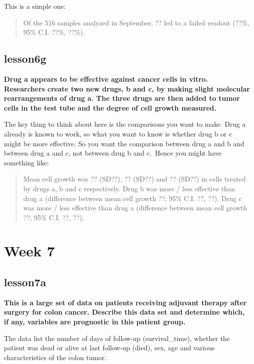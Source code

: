 \documentclass[]{book}
\begin{document}
This is a simple one:

\begin{quote}
Of the 516 samples analyzed in September, ?? led to a failed readout (??\%, 95\% C.I. ??\%, ??\%).
\end{quote}

\hypertarget{lesson6g}{%
\subsection{lesson6g}\label{lesson6g}}

\textbf{Drug a appears to be effective against cancer cells in vitro. Researchers create two new drugs, b and c, by making slight molecular rearrangements of drug a. The three drugs are then added to tumor cells in the test tube and the degree of cell growth measured.}

The key thing to think about here is the comparisons you want to make. Drug a already is known to work, so what you want to know is whether drug b or c might be more effective. So you want the comparison between drug a and b and between drug a and c, not between drug b and c.~Hence you might have something like:

\begin{quote}
Mean cell growth was ?? (SD??), ?? (SD??) and ?? (SD??) in cells treated by drugs a, b and c respectively. Drug b was more / less effective than drug a (difference between mean cell growth ??; 95\% C.I. ??, ??). Drug c was more / less effective than drug a (difference between mean cell growth ??; 95\% C.I. ??, ??).
\end{quote}

\hypertarget{week-7-1}{%
\section{Week 7}\label{week-7-1}}

\hypertarget{lesson7a}{%
\subsection{lesson7a}\label{lesson7a}}

\textbf{This is a large set of data on patients receiving adjuvant therapy after surgery for colon cancer. Describe this data set and determine which, if any, variables are prognostic in this patient group.}

The data list the number of days of follow-up (survival\_time), whether the patient was dead or alive at last follow-up (died), sex, age and various characteristics of the colon tumor.
\end{document}
